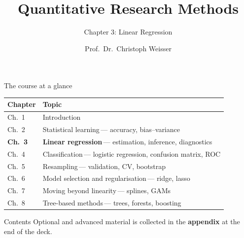 \documentclass[aspectratio=169,11pt]{beamer}
\title{Quantitative Research Methods}
\subtitle{Chapter 3: Linear Regression}
\author{Prof.\ Dr.\ Christoph Weisser}
\date{}
\begin{document}
\begin{frame}[plain]
  \titlepage
\end{frame}

\begin{frame}{The course at a glance}
  \vspace{-1.5mm}
  \begin{center}
  \scriptsize
  \setlength{\tabcolsep}{5pt}
  \renewcommand{\arraystretch}{1.30}
  \begin{tabular}{@{\hspace{2pt}}l >{\raggedright\arraybackslash}p{}@{\hspace{2pt}}}
    \toprule
    \textbf{Chapter} & \textbf{Topic} \\
    \midrule
     {\color{accent}Ch.\ 1} & Introduction \\
    \rowcolor{black!3} {\color{accent}Ch.\ 2} & Statistical learning\,{\color{black!45}--- accuracy, bias--variance} \\
    \rowcolor{accent!18} \textbf{Ch.\ 3} & \textbf{Linear regression}\,{\color{accent!75!black}--- estimation, inference, diagnostics} \\
    \rowcolor{black!3} {\color{accent}Ch.\ 4} & Classification\,{\color{black!45}--- logistic regression, confusion matrix, ROC} \\
     {\color{accent}Ch.\ 5} & Resampling\,{\color{black!45}--- validation, CV, bootstrap} \\
    \rowcolor{black!3} {\color{accent}Ch.\ 6} & Model selection and regularisation\,{\color{black!45}--- ridge, lasso} \\
     {\color{accent}Ch.\ 7} & Moving beyond linearity\,{\color{black!45}--- splines, GAMs} \\
    \rowcolor{black!3} {\color{accent}Ch.\ 8} & Tree-based methods\,{\color{black!45}--- trees, forests, boosting} \\
    \bottomrule
  \end{tabular}
  \end{center}
\end{frame}



\begin{frame}{Contents}\footnotesize
  \tableofcontents[hideallsubsections]
  \vfill
  {\tiny Optional and advanced material is collected in the \textbf{appendix} at the end of the deck.}
\end{frame}
\end{document}

